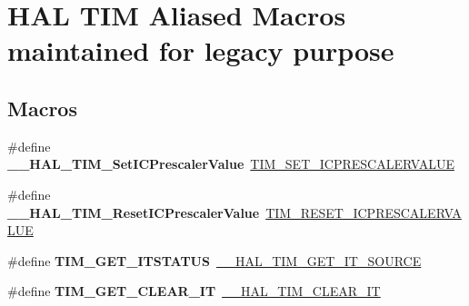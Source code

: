 \hypertarget{group___h_a_l___t_i_m___aliased___macros}{\section{H\-A\-L T\-I\-M Aliased Macros maintained for legacy purpose}
\label{group___h_a_l___t_i_m___aliased___macros}
}
\subsection*{Macros}
\begin{DoxyCompactItemize}
\item 
\hypertarget{group___h_a_l___t_i_m___aliased___macros_ga1f487f25516b3fd87b864f5be8229b7e}{\#define {\bfseries \-\_\-\-\_\-\-H\-A\-L\-\_\-\-T\-I\-M\-\_\-\-Set\-I\-C\-Prescaler\-Value}~\hyperlink{group___t_i_m___private___macros_ga99724157918ca8b4d8babee1d8008dcb}{T\-I\-M\-\_\-\-S\-E\-T\-\_\-\-I\-C\-P\-R\-E\-S\-C\-A\-L\-E\-R\-V\-A\-L\-U\-E}}\label{group___h_a_l___t_i_m___aliased___macros_ga1f487f25516b3fd87b864f5be8229b7e}

\item 
\hypertarget{group___h_a_l___t_i_m___aliased___macros_gac171a25ce55eafe62671d40d7397d721}{\#define {\bfseries \-\_\-\-\_\-\-H\-A\-L\-\_\-\-T\-I\-M\-\_\-\-Reset\-I\-C\-Prescaler\-Value}~\hyperlink{group___t_i_m___private___macros_ga18ded32faf42c8981c8d2970bb02e126}{T\-I\-M\-\_\-\-R\-E\-S\-E\-T\-\_\-\-I\-C\-P\-R\-E\-S\-C\-A\-L\-E\-R\-V\-A\-L\-U\-E}}\label{group___h_a_l___t_i_m___aliased___macros_gac171a25ce55eafe62671d40d7397d721}

\item 
\hypertarget{group___h_a_l___t_i_m___aliased___macros_ga1dd7eae80b853d3526091193e81b4731}{\#define {\bfseries T\-I\-M\-\_\-\-G\-E\-T\-\_\-\-I\-T\-S\-T\-A\-T\-U\-S}~\hyperlink{group___t_i_m___exported___macros_ga644babf93470a6eee6bce8906c4da5c5}{\-\_\-\-\_\-\-H\-A\-L\-\_\-\-T\-I\-M\-\_\-\-G\-E\-T\-\_\-\-I\-T\-\_\-\-S\-O\-U\-R\-C\-E}}\label{group___h_a_l___t_i_m___aliased___macros_ga1dd7eae80b853d3526091193e81b4731}

\item 
\hypertarget{group___h_a_l___t_i_m___aliased___macros_gadd580b2357a85c03653006349721a36e}{\#define {\bfseries T\-I\-M\-\_\-\-G\-E\-T\-\_\-\-C\-L\-E\-A\-R\-\_\-\-I\-T}~\hyperlink{group___t_i_m___exported___macros_gaea68155ce77e591e0c2582def061d6f0}{\-\_\-\-\_\-\-H\-A\-L\-\_\-\-T\-I\-M\-\_\-\-C\-L\-E\-A\-R\-\_\-\-I\-T}}\label{group___h_a_l___t_i_m___aliased___macros_gadd580b2357a85c03653006349721a36e}


\end{DoxyCompactItemize}
